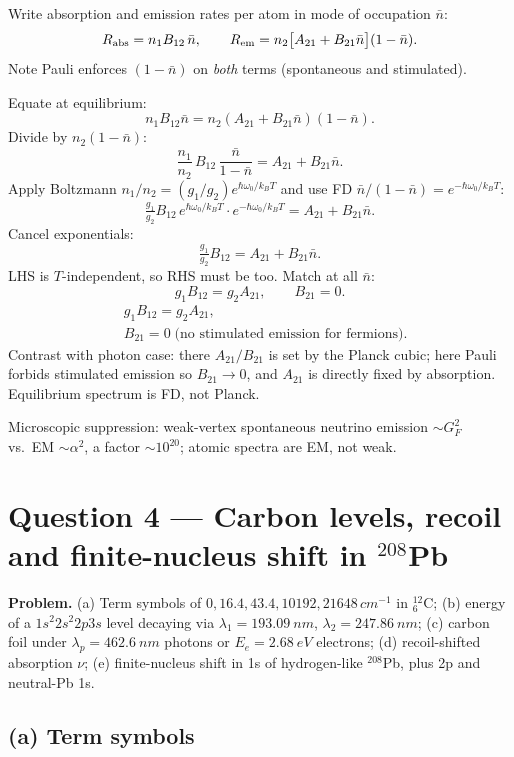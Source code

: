 \documentclass[11pt]{article}
\begin{document}
Write absorption and emission rates per atom in mode of occupation $\bar n$:
\[
R_{\rm abs}=n_1 B_{12}\,\bar n,\qquad R_{\rm em}=n_2\bigl[A_{21}+B_{21}\bar n\bigr](1-\bar n).
\]
Note Pauli enforces $(1-\bar n)$ on \emph{both} terms (spontaneous and stimulated).

Equate at equilibrium:
\[
n_1 B_{12}\bar n=n_2(A_{21}+B_{21}\bar n)(1-\bar n).
\]
Divide by $n_2(1-\bar n)$:
\[
\frac{n_1}{n_2}\,B_{12}\,\frac{\bar n}{1-\bar n}=A_{21}+B_{21}\bar n.
\]
Apply Boltzmann $n_1/n_2=(g_1/g_2)e^{\hbar\omega_0/k_B T}$ and use FD $\bar n/(1-\bar n)=e^{-\hbar\omega_0/k_B T}$:
\[
\tfrac{g_1}{g_2}B_{12}\,e^{\hbar\omega_0/k_B T}\cdot e^{-\hbar\omega_0/k_B T}=A_{21}+B_{21}\bar n.
\]
Cancel exponentials:
\[
\tfrac{g_1}{g_2}B_{12}=A_{21}+B_{21}\bar n.
\]
LHS is $T$-independent, so RHS must be too. Match at all $\bar n$:
\[
g_1 B_{12}=g_2 A_{21},\qquad B_{21}=0.
\]
\begin{equation}
\boxed{\;
\begin{aligned}
&g_1 B_{12}=g_2 A_{21},\\
&B_{21}=0\;\text{(no stimulated emission for fermions)}.
\end{aligned}\;}
\label{eq:nu-einstein}
\end{equation}
Contrast with photon case: there $A_{21}/B_{21}$ is set by the Planck cubic; here Pauli forbids stimulated emission so $B_{21}\!\to\!0$, and $A_{21}$ is directly fixed by absorption. Equilibrium spectrum is FD, not Planck.

Microscopic suppression: weak-vertex spontaneous neutrino emission $\sim G_F^2$ vs.\ EM $\sim\alpha^2$, a factor $\sim 10^{20}$; atomic spectra are EM, not weak.

\section*{Question 4 --- Carbon levels, recoil and finite-nucleus shift in $^{208}$Pb}

\textbf{Problem.} (a) Term symbols of $0,16.4,43.4,10192,21648\,\si{cm^{-1}}$ in $^{12}_{6}$C; (b) energy of a $1s^2 2s^2 2p3s$ level decaying via $\lambda_1=\SI{193.09}{nm}$, $\lambda_2=\SI{247.86}{nm}$; (c) carbon foil under $\lambda_p=\SI{462.6}{nm}$ photons or $E_e=\SI{2.68}{eV}$ electrons; (d) recoil-shifted absorption $\nu$; (e) finite-nucleus shift in 1s of hydrogen-like $^{208}$Pb, plus 2p and neutral-Pb 1s.

\subsection*{(a) Term symbols}
\end{document}
